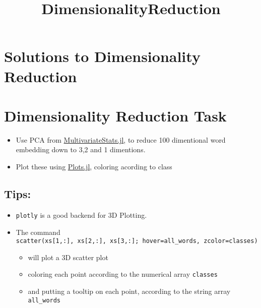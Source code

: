 \documentclass[11pt]{article}
\title{DimensionalityReduction}
\providecommand{\tightlist}{%
      \setlength{\itemsep}{0pt}\setlength{\parskip}{0pt}}
\begin{document}
    
    
    \maketitle
    
    

    
    \hypertarget{solutions-to-dimensionality-reduction}{%
\section{Solutions to Dimensionality
Reduction}\label{solutions-to-dimensionality-reduction}}

\hypertarget{dimensionality-reduction-task}{%
\section{Dimensionality Reduction
Task}\label{dimensionality-reduction-task}}

\begin{itemize}
\tightlist
\item
  Use PCA from
  \href{https://github.com/JuliaStats/MultivariateStats.jl}{MultivariateStats.jl},
  to reduce 100 dimentional word embedding down to 3,2 and 1 dimentions.
\item
  Plot these using
  \href{https://github.com/tbreloff/Plots.jl}{Plots.jl}, coloring
  acording to class
\end{itemize}

\hypertarget{tips}{%
\subsection{Tips:}\label{tips}}

\begin{itemize}
\tightlist
\item
  \texttt{plotly} is a good backend for 3D Plotting.
\item
  The command
  \texttt{scatter(xs{[}1,:{]},\ xs{[}2,:{]},\ xs{[}3,:{]};\ hover=all\_words,\ zcolor=classes)}

  \begin{itemize}
  \tightlist
  \item
    will plot a 3D scatter plot
  \item
    coloring each point according to the numerical array
    \texttt{classes}
  \item
    and putting a tooltip on each point, according to the string array
    \texttt{all\_words}
  \end{itemize}
\end{itemize}
\end{document}
